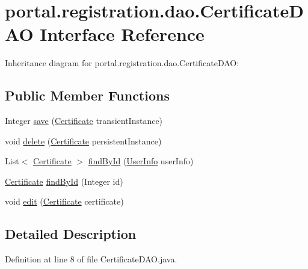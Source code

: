 \hypertarget{interfaceportal_1_1registration_1_1dao_1_1CertificateDAO}{
\section{portal.registration.dao.CertificateDAO Interface Reference}
\label{interfaceportal_1_1registration_1_1dao_1_1CertificateDAO}
}


Inheritance diagram for portal.registration.dao.CertificateDAO:
\subsection*{Public Member Functions}
\begin{DoxyCompactItemize}
\item 
Integer \hyperlink{interfaceportal_1_1registration_1_1dao_1_1CertificateDAO_a7451336de83411bab9a9d61b6ca719ee}{save} (\hyperlink{classportal_1_1registration_1_1domain_1_1Certificate}{Certificate} transientInstance)
\item 
void \hyperlink{interfaceportal_1_1registration_1_1dao_1_1CertificateDAO_ab535f1e3d72dc9bd0bcda6c042d513bb}{delete} (\hyperlink{classportal_1_1registration_1_1domain_1_1Certificate}{Certificate} persistentInstance)
\item 
List$<$ \hyperlink{classportal_1_1registration_1_1domain_1_1Certificate}{Certificate} $>$ \hyperlink{interfaceportal_1_1registration_1_1dao_1_1CertificateDAO_a1a1782267b60378309ca30ce76528fd4}{findById} (\hyperlink{classportal_1_1registration_1_1domain_1_1UserInfo}{UserInfo} userInfo)
\item 
\hyperlink{classportal_1_1registration_1_1domain_1_1Certificate}{Certificate} \hyperlink{interfaceportal_1_1registration_1_1dao_1_1CertificateDAO_aecb22f7cf02b37a0330600686147243d}{findById} (Integer id)
\item 
void \hyperlink{interfaceportal_1_1registration_1_1dao_1_1CertificateDAO_ab538437429b4b6b2065affa7b2742f45}{edit} (\hyperlink{classportal_1_1registration_1_1domain_1_1Certificate}{Certificate} certificate)
\end{DoxyCompactItemize}


\subsection{Detailed Description}


Definition at line 8 of file CertificateDAO.java.



